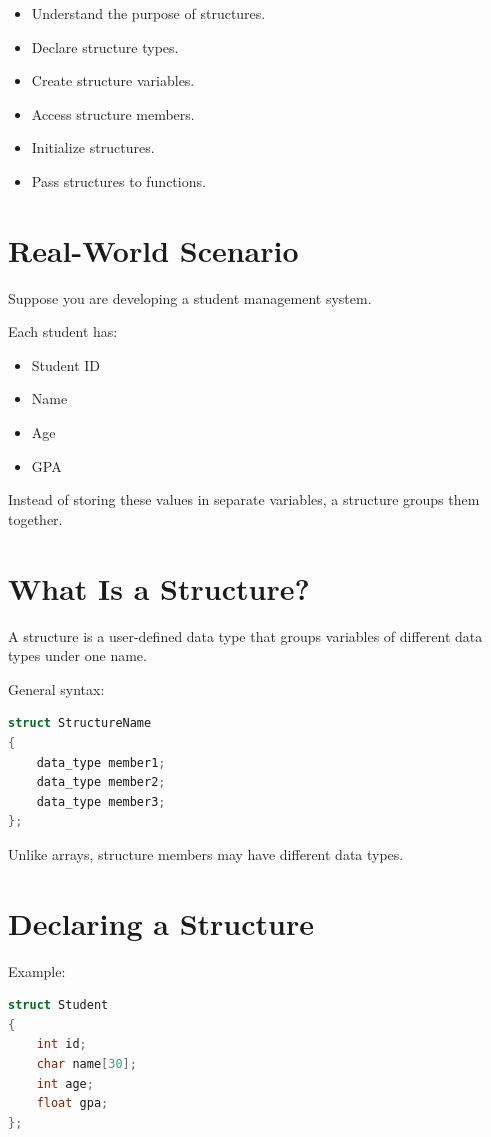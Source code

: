 \documentclass[12pt,openany]{book}
\begin{document}
\begin{itemize}
    \item Understand the purpose of structures.
    \item Declare structure types.
    \item Create structure variables.
    \item Access structure members.
    \item Initialize structures.
    \item Pass structures to functions.
\end{itemize}

\section{Real-World Scenario}

Suppose you are developing a student management system.

Each student has:

\begin{itemize}
    \item Student ID
    \item Name
    \item Age
    \item GPA
\end{itemize}

Instead of storing these values in separate variables, a structure groups them together.

\section{What Is a Structure?}

A structure is a user-defined data type that groups variables of different data types under one name.

General syntax:

\begin{lstlisting}[language=C]
struct StructureName
{
    data_type member1;
    data_type member2;
    data_type member3;
};
\end{lstlisting}

Unlike arrays, structure members may have different data types.
\section{Declaring a Structure}

Example:

\begin{lstlisting}[language=C]
struct Student
{
    int id;
    char name[30];
    int age;
    float gpa;
};
\end{lstlisting}
\end{document}
